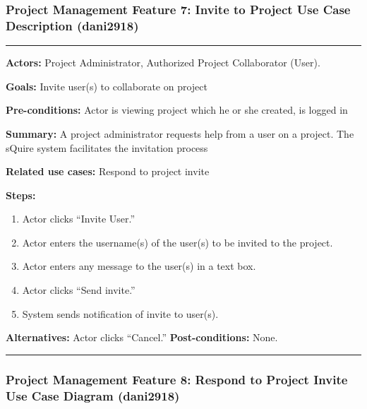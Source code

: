 \documentclass[twoside,letterpaper]{article}
\begin{document}
	
	\subsubsection[Project Management Feature 7: Invite to Project Use Case Description (dani2918)]{\rmfamily\bfseries\color{black}
		Project Management Feature 7: Invite to Project Use Case Description  (dani2918)}
		\label{pm:uc5}
	\hypertarget{RefHeading22059017292}{}
	\bigskip
	
	\vspace{2pt}
	\hrule
	\vspace{8pt}
	\noindent \textbf{Actors:} Project Administrator, Authorized Project Collaborator (User).  \newline
	
	\noindent \textbf{Goals:} Invite user(s) to collaborate on project \newline
	
	\noindent  \textbf{Pre-conditions:} Actor is viewing project which he or she created, is logged in   \newline
	
	\noindent \textbf{Summary:} A project administrator requests help from a user on a project. The sQuire system facilitates the invitation process  \newline
	
	\noindent \textbf{Related use cases:} Respond to project invite\newline
	
	\noindent \textbf{Steps:} \begin{enumerate}
	  \item Actor clicks ``Invite User.''
	  \item Actor enters the username(s) of the user(s) to be invited to the project.
	  \item Actor enters any message to the user(s) in a text box.
	  \item Actor clicks ``Send invite.''
	  \item System sends notification of invite to user(s).
	 \end{enumerate}
	 
	\noindent  \textbf{Alternatives:} Actor clicks ``Cancel.''
	 \textbf{Post-conditions:} None.  \newline
	 
	\vspace{8pt}
	\hrule
	\newpage
	
	\subsubsection[Project Management Feature 8: Respond to Project Invite Use Case Diagram (dani2918)]{\rmfamily\bfseries\color{black}
		Project Management Feature 8: Respond to Project Invite Use Case Diagram (dani2918)}
	\hypertarget{RefHeading22059017292}{}
	\bigskip
	
\end{document}

